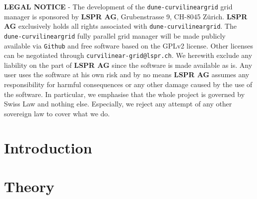 \documentclass[a4paper,11pt]{article}
\begin{document}
\vspace{20mm}
{\small
\noindent \textbf{LEGAL NOTICE} - The development of the \texttt{dune-curvilineargrid} grid manager is sponsored by \textbf{LSPR AG}, Grubenstrasse 9, CH-8045 Z\"urich. \textbf{LSPR AG} exclusively holds all rights associated with \texttt{dune-curvilineargrid}.
The \texttt{dune-curvilineargrid} fully parallel grid manager will be made publicly available via \texttt{Github}
and free software based on the GPLv2 license. Other licenses can be negotiated through \texttt{curvilinear-grid@lspr.ch}.
We herewith exclude any liability on the part of \textbf{LSPR AG} since the software is made available as is. Any user uses the software at his own risk and by no means \textbf{LSPR AG} assumes any responsibility for harmful consequences or any other damage caused by the use of the software. In particular, we emphasise that the whole project is governed by Swiss Law and nothing else. Especially, we reject any attempt of any other sovereign law to cover what we do.
}


\newpage
\tableofcontents


\newpage
\section{Introduction}








\newpage
\section{Theory}








\end{document}
